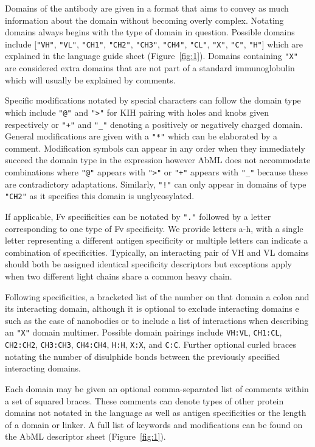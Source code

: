 \documentclass{article}
\begin{document}
Domains of the antibody are given in a format that aims to convey as
much information about the domain without becoming overly
complex. Notating domains always begins with the type of domain in
question. Possible domains include [\verb|"VH"|, \verb|"VL"|,
\verb|"CH1"|, \verb|"CH2"|, \verb|"CH3"|, \verb|"CH4"|, \verb|"CL"|,
\verb|"X"|, \verb|"C"|, \verb|"H"|] which are explained in the
language guide sheet (Figure~\ref{fig:1}). Domains containing
\verb|"X"| are considered extra domains that are not part of a
standard immunoglobulin which will usually be explained by comments.

Specific modifications notated by special characters can follow the
domain type which include \verb|"@"| and \verb|">"| for KIH pairing
with holes and knobs given respectively or \verb|"+"| and \verb|"_"|
denoting a positively or negatively charged domain. General
modifications are given with a \verb|"*"| which can be elaborated by a
comment. Modification symbols can appear in any order when they
immediately succeed the domain type in the expression however AbML
does not accommodate combinations where \verb|"@"| appears with
\verb|">"| or \verb|"+"| appears with \verb|"_"| because these are
contradictory adaptations. Similarly, \verb|"!"| can only appear in
domains of type \verb|"CH2"| as it specifies this domain is
unglycosylated.

If applicable, Fv specificities can be notated by \verb|"."| followed by a
letter corresponding to one type of Fv specificity. We provide letters
a-h, with a single letter representing a different antigen specificity
or multiple letters can indicate a combination of
specificities. Typically, an interacting pair of VH and VL domains
should both be assigned identical specificity descriptors but
exceptions apply when two different light chains share a common heavy
chain. 

Following specificities, a bracketed list of the number on that domain
a colon and its interacting domain, although it is optional to exclude
interacting domains e such as the case of nanobodies or to include a
list of interactions when describing an \verb|"X"| domain
multimer. Possible domain pairings include \verb|VH:VL|,
\verb|CH1:CL|, \verb|CH2:CH2|, \verb|CH3:CH3|, \verb|CH4:CH4|,
\verb|H:H|, \verb|X:X|, and \verb|C:C|. Further optional curled braces
notating the number of disulphide bonds between the previously
specified interacting domains.

Each domain may be given an optional comma-separated list of comments
within a set of  squared braces. These comments can denote types of
other protein domains not notated in the language as well as antigen
specificities or the length of a domain or linker. A full list of
keywords and modifications can be found on the AbML descriptor sheet
(Figure~\ref{fig:1}).
\end{document}
